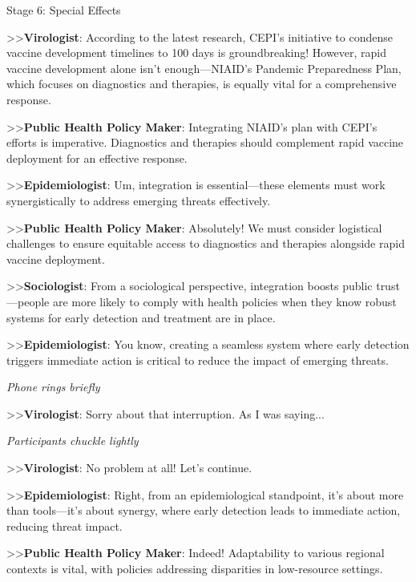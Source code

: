\begin{figure*}[t]
    \begin{AIbox}{Stage 6: Special Effects}
    \parbox[t]{\textwidth}{
    >>\textbf{Virologist}: According to the latest research, CEPI's initiative to condense vaccine development timelines to 100 days is groundbreaking! However, rapid vaccine development alone isn't enough—NIAID's Pandemic Preparedness Plan, which focuses on diagnostics and therapies, is equally vital for a comprehensive response.

    >>\textbf{Public Health Policy Maker}: Integrating NIAID's plan with CEPI's efforts is imperative. Diagnostics and therapies should complement rapid vaccine deployment for an effective response.

    >>\textbf{Epidemiologist}: Um, integration is essential—these elements must work synergistically to address emerging threats effectively.

    >>\textbf{Public Health Policy Maker}: Absolutely! We must consider logistical challenges to ensure equitable access to diagnostics and therapies alongside rapid vaccine deployment.

    >>\textbf{Sociologist}: From a sociological perspective, integration boosts public trust—people are more likely to comply with health policies when they know robust systems for early detection and treatment are in place.

    >>\textbf{Epidemiologist}\textbf{}: You know, creating a seamless system where early detection triggers immediate action is critical to reduce the impact of emerging threats.

    \textit{Phone rings briefly}

    >>\textbf{Virologist}: Sorry about that interruption. As I was saying...

   \textit{Participants chuckle lightly}

    >>\textbf{Virologist}: No problem at all! Let's continue.

    >>\textbf{Epidemiologist}: Right, from an epidemiological standpoint, it’s about more than tools—it’s about synergy, where early detection leads to immediate action, reducing threat impact.

    >>\textbf{Public Health Policy Maker}: Indeed! Adaptability to various regional contexts is vital, with policies addressing disparities in low-resource settings.
    }
    \end{AIbox}
    \caption{Stage 6: Special Effects — Full dialogue with interruptions and interactions.}
    \label{fig:stage6_special_effects}
\end{figure*}





